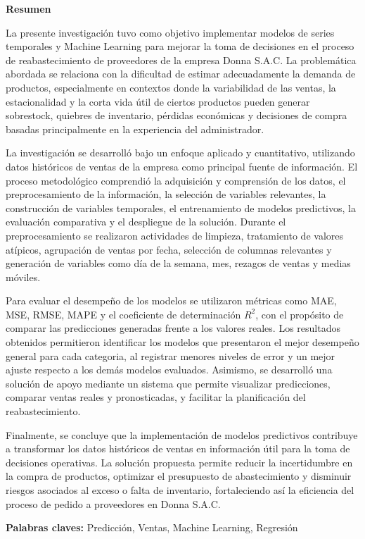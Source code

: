\thispagestyle{plain}
\begin{center}
	\vspace*{1.5cm}
	{\Large \bfseries  Resumen}
\end{center}
\vspace{0.5cm}
La presente investigación tuvo como objetivo implementar modelos de series temporales y Machine Learning para 
mejorar la toma de decisiones en el proceso de reabastecimiento de proveedores de la empresa Donna S.A.C. 
La problemática abordada se relaciona con la dificultad de estimar adecuadamente la demanda de productos, especialmente en 
contextos donde la variabilidad de las ventas, la estacionalidad y la corta vida útil de ciertos productos 
pueden generar sobrestock, quiebres de inventario, pérdidas económicas y decisiones de compra basadas 
principalmente en la experiencia del administrador.

La investigación se desarrolló bajo un enfoque aplicado y cuantitativo, utilizando datos históricos de ventas 
de la empresa como principal fuente de información. El proceso metodológico comprendió la adquisición y 
comprensión de los datos, el preprocesamiento de la información, la selección de variables relevantes, la 
construcción de variables temporales, el entrenamiento de modelos predictivos, la evaluación comparativa y 
el despliegue de la solución. Durante el preprocesamiento se realizaron actividades de limpieza, tratamiento 
de valores atípicos, agrupación de ventas por fecha, selección de columnas relevantes y generación de variables 
como día de la semana, mes, rezagos de ventas y medias móviles.

Para evaluar el desempeño de los modelos se utilizaron métricas como MAE, MSE, RMSE, MAPE y el coeficiente de 
determinación $R^2$, con el propósito de comparar las predicciones generadas frente a los valores reales. 
Los resultados obtenidos permitieron identificar los modelos que presentaron el mejor desempeño general para cada categoria, 
al registrar menores niveles de error y un mejor ajuste respecto a los demás modelos evaluados. Asimismo, se 
desarrolló una solución de apoyo mediante un sistema que permite visualizar predicciones, comparar ventas reales 
y pronosticadas, y facilitar la planificación del reabastecimiento.

Finalmente, se concluye que la implementación de modelos predictivos contribuye a transformar los datos 
históricos de ventas en información útil para la toma de decisiones operativas. La solución propuesta permite 
reducir la incertidumbre en la compra de productos, optimizar el presupuesto de abastecimiento y disminuir 
riesgos asociados al exceso o falta de inventario, fortaleciendo así la eficiencia del proceso de pedido a 
proveedores en Donna S.A.C.

\textbf{Palabras claves: } Predicción, Ventas, Machine Learning, Regresión